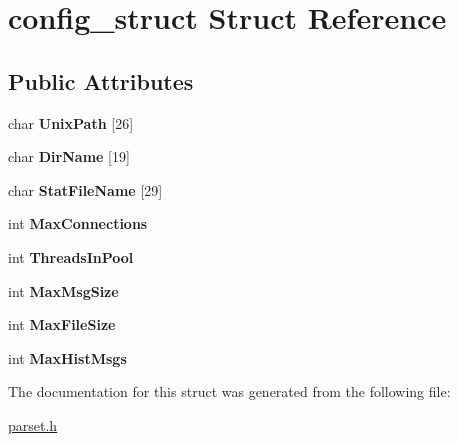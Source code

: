 \hypertarget{structconfig__struct}{}\section{config\+\_\+struct Struct Reference}
\label{structconfig__struct}
\subsection*{Public Attributes}
\begin{DoxyCompactItemize}
\item 
char {\bfseries Unix\+Path} \mbox{[}26\mbox{]}\hypertarget{structconfig__struct_a61e0187358aad8f1ba83deeb530e6a30}{}\label{structconfig__struct_a61e0187358aad8f1ba83deeb530e6a30}

\item 
char {\bfseries Dir\+Name} \mbox{[}19\mbox{]}\hypertarget{structconfig__struct_a33729c3065c6a00784c600d6edb2936f}{}\label{structconfig__struct_a33729c3065c6a00784c600d6edb2936f}

\item 
char {\bfseries Stat\+File\+Name} \mbox{[}29\mbox{]}\hypertarget{structconfig__struct_a74d3d152d8fb8bd9d5567466abcb7359}{}\label{structconfig__struct_a74d3d152d8fb8bd9d5567466abcb7359}

\item 
int {\bfseries Max\+Connections}\hypertarget{structconfig__struct_a62f67b20aec306c9e0f232a3e45643f8}{}\label{structconfig__struct_a62f67b20aec306c9e0f232a3e45643f8}

\item 
int {\bfseries Threads\+In\+Pool}\hypertarget{structconfig__struct_a2574d87954575bc19301690b84e7ab3a}{}\label{structconfig__struct_a2574d87954575bc19301690b84e7ab3a}

\item 
int {\bfseries Max\+Msg\+Size}\hypertarget{structconfig__struct_a7a5b20ba474362f7a500b77067c82a0c}{}\label{structconfig__struct_a7a5b20ba474362f7a500b77067c82a0c}

\item 
int {\bfseries Max\+File\+Size}\hypertarget{structconfig__struct_aaefebe4938f8f89ce17ff7ad72360123}{}\label{structconfig__struct_aaefebe4938f8f89ce17ff7ad72360123}

\item 
int {\bfseries Max\+Hist\+Msgs}\hypertarget{structconfig__struct_a522362db79894737c9f0199f695d928b}{}\label{structconfig__struct_a522362db79894737c9f0199f695d928b}

\end{DoxyCompactItemize}


The documentation for this struct was generated from the following file\+:\begin{DoxyCompactItemize}
\item 
\hyperlink{parset_8h}{parset.\+h}\end{DoxyCompactItemize}
